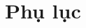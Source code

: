 \clearpage
{}

\chapter*{Phụ lục}
\renewcommand{\thefigure}{A.\arabic{figure}} 
\setcounter{figure}{0}
\begin{enumerate}[A$).$]


	
\end{enumerate}